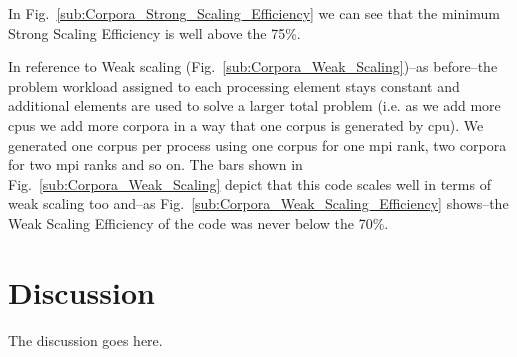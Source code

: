 \documentclass[10pt,journal,compsoc]{IEEEtran}
\begin{document}
In Fig.~\ref{sub:Corpora_Strong_Scaling_Efficiency} we can see that the minimum Strong Scaling Efficiency is well above the 75\%.

In reference to Weak scaling (Fig.~\ref{sub:Corpora_Weak_Scaling})--as before--the problem workload assigned to each processing element stays constant and additional elements are used to solve a larger total problem (i.e. as we add more \glspl{cpu} we add more corpora in a way that one corpus is generated by \gls{cpu}). We generated one corpus per process using one corpus for one \gls{mpi} rank, two corpora for two \gls{mpi} ranks and so on. The bars shown in Fig.~\ref{sub:Corpora_Weak_Scaling} depict that this code scales well in terms of weak scaling too and--as Fig.~\ref{sub:Corpora_Weak_Scaling_Efficiency} shows--the Weak Scaling Efficiency of the code was never below the 70\%.










\section{Discussion}
The discussion goes here.















%
%
\end{document}
